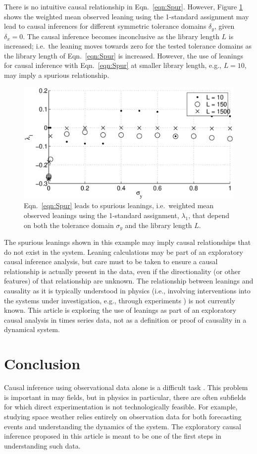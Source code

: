 \documentclass[twocolumn,aps,pre,groupedaddress]{revtex4-1}
\begin{document}
There is no intuitive causal relationship in Eqn.\ \ref{eqn:Spur}.  However, Figure \ref{fig:nocause} shows the weighted mean observed leaning using the 1-standard assignment may lead to causal inferences for different symmetric tolerance domains $\delta_y$, given $\delta_x = 0$.  The causal inference becomes inconclusive as the library length $L$ is increased; i.e.\ the leaning moves towards zero for the tested tolerance domains as the library length of Eqn.\ \ref{eqn:Spur} is increased.  However, the use of leanings for causal inference with Eqn.\ \ref{eqn:Spur} at smaller library length, e.g., $L=10$, may imply a spurious relationship. 
\begin{figure}[ht]
\includegraphics[scale=0.40]{NoCauseplot.eps}
\caption{Eqn.\ \ref{eqn:Spur} leads to spurious leanings, i.e.\ weighted mean observed leanings using the 1-standard assignment, $\lambda_1$, that depend on both the tolerance domain $\sigma_y$ and the library length $L$.}
\label{fig:nocause}
\end{figure}

The spurious leanings shown in this example may imply causal relationships that do not exist in the system.  Leaning calculations may be part of an exploratory causal inference analysis, but care must to be taken to ensure a causal relationship is actually present in the data, even if the directionality (or other features) of that relationship are unknown.  The relationship between leanings and causality as it is typically understood in physics (i.e., involving interventions into the systems under investigation, e.g., through experiments \cite{Pearl2000}) is not currently known.  This article is exploring the use of leanings as part of an exploratory causal analysis in times series data, not as a definition or proof of causality in a dynamical system.   

\section{Conclusion}
Causal inference using observational data alone is a difficult task \cite{kleinberg2012}.  This problem is important in may fields, but in physics in particular, there are often subfields for which direct experimentation is not technologically feasible.  For example, studying space weather relies entirely on observation data for both forecasting events and understanding the dynamics of the system.  The exploratory causal inference proposed in this article is meant to be one of the first steps in understanding such data.  
\end{document}
